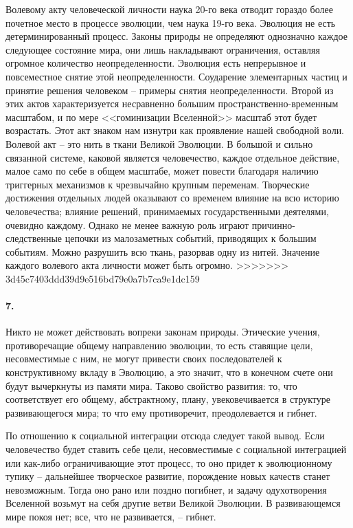 \documentclass{book}
\begin{document}
Волевому акту человеческой личности наука 20-го века отводит гораздо более почетное место в процессе эволюции, чем наука 19-го века. Эволюция не есть детерминированный процесс. Законы природы не определяют однозначно каждое следующее состояние мира, они лишь накладывают ограничения, оставляя огромное количество неопределенности. Эволюция есть непрерывное и повсеместное снятие этой неопределенности. Соударение элементарных частиц и принятие решения человеком -- примеры снятия неопределенности. Второй из этих актов характеризуется несравненно большим пространственно-временным масштабом, и по мере <<гоминизации Вселенной>> масштаб этот будет возрастать. Этот акт знаком нам изнутри как проявление нашей свободной воли. Волевой акт -- это нить в ткани Великой Эволюции. В большой и сильно связанной системе, каковой является человечество, каждое отдельное действие, малое само по себе в общем масштабе, может повести благодаря наличию триггерных механизмов к чрезвычайно крупным переменам. Творческие достижения отдельных 
людей оказывают со временем влияние на всю историю человечества; влияние решений, принимаемых государственными деятелями, очевидно каждому. Однако не менее важную роль играют причинно-следственные цепочки из малозаметных событий, приводящих к большим событиям. Можно разрушить всю ткань, разорвав одну из нитей. Значение каждого волевого акта личности может быть огромно.
>>>>>>> 3d45c7403ddd39d9e516bd79e0a7b7ca9e1dc159

\paragraph{7.} Никто не может действовать вопреки законам природы. Этические учения, противоречащие общему направлению эволюции, то есть ставящие цели, несовместимые с ним, не могут привести своих последователей к конструктивному вкладу в Эволюцию, а это значит, что в конечном счете они будут вычеркнуты из памяти мира. Таково свойство развития: то, что соответствует его общему, абстрактному, плану, увековечивается в структуре развивающегося мира; то что ему противоречит, преодолевается и гибнет.

По отношению к социальной интеграции отсюда следует такой вывод. Если человечество будет ставить себе цели, несовместимые с социальной интеграцией или как-либо ограничивающие этот процесс, то оно придет к эволюционному тупику -- дальнейшее творческое развитие, порождение новых качеств станет невозможным. Тогда оно рано или поздно погибнет, и задачу одухотворения Вселенной возьмут на себя другие ветви Великой Эволюции. В развивающемся мире покоя нет; все, что не развивается, -- гибнет.
\end{document}
